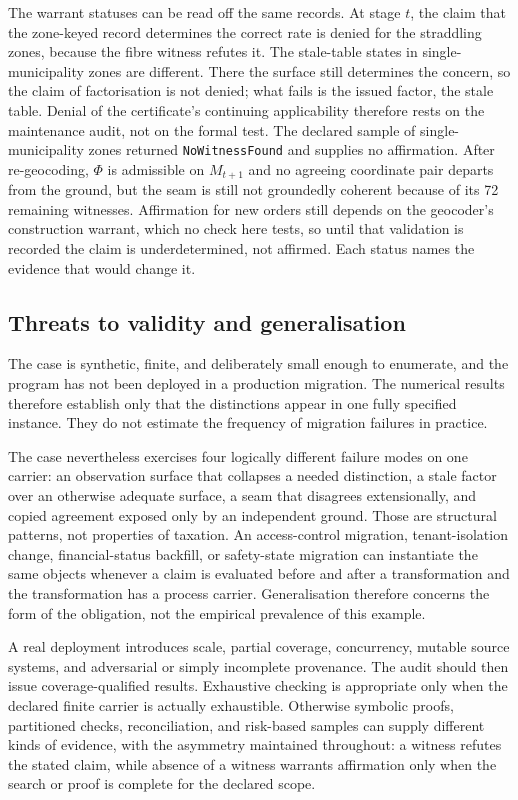 \documentclass[smallextended,envcountsect,envcountsame,natbib]{svjour3}
\newcommand{\code}[1]{\texttt{#1}}
\begin{document}
The warrant statuses can be read off the same records. At stage $t$, the claim that the zone-keyed record determines the correct rate is denied for the straddling zones, because the fibre witness refutes it. The stale-table states in single-municipality zones are different. There the surface still determines the concern, so the claim of factorisation is not denied; what fails is the issued factor, the stale table. Denial of the certificate's continuing applicability therefore rests on the maintenance audit, not on the formal test. The declared sample of single-municipality zones returned \code{NoWitnessFound} and supplies no affirmation. After re-geocoding, $\Phi$ is admissible on $M_{t+1}$ and no agreeing coordinate pair departs from the ground, but the seam is still not groundedly coherent because of its 72 remaining witnesses. Affirmation for new orders still depends on the geocoder's construction warrant, which no check here tests, so until that validation is recorded the claim is underdetermined, not affirmed. Each status names the evidence that would change it.

\subsection{Threats to validity and generalisation}\label{ex:sec:threats}
The case is synthetic, finite, and deliberately small enough to enumerate, and the program has not been deployed in a production migration. The numerical results therefore establish only that the distinctions appear in one fully specified instance. They do not estimate the frequency of migration failures in practice.

The case nevertheless exercises four logically different failure modes on one carrier: an observation surface that collapses a needed distinction, a stale factor over an otherwise adequate surface, a seam that disagrees extensionally, and copied agreement exposed only by an independent ground. Those are structural patterns, not properties of taxation. An access-control migration, tenant-isolation change, financial-status backfill, or safety-state migration can instantiate the same objects whenever a claim is evaluated before and after a transformation and the transformation has a process carrier. Generalisation therefore concerns the form of the obligation, not the empirical prevalence of this example.

A real deployment introduces scale, partial coverage, concurrency, mutable source systems, and adversarial or simply incomplete provenance. The audit should then issue coverage-qualified results. Exhaustive checking is appropriate only when the declared finite carrier is actually exhaustible. Otherwise symbolic proofs, partitioned checks, reconciliation, and risk-based samples can supply different kinds of evidence, with the asymmetry maintained throughout: a witness refutes the stated claim, while absence of a witness warrants affirmation only when the search or proof is complete for the declared scope.
\end{document}
